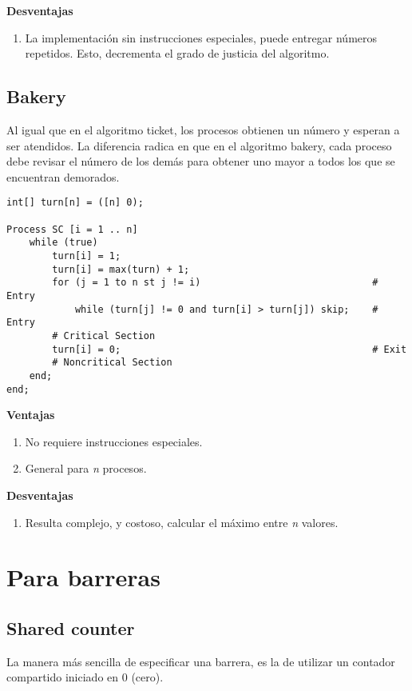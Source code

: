 \documentclass[a4paper, 10pt]{report}
\begin{document}
\textbf{Desventajas}
\begin{enumerate}
    \item La implementación sin instrucciones especiales, puede entregar números repetidos. Esto, decrementa el grado de justicia del algoritmo.
\end{enumerate}


\subsection{Bakery}

Al igual que en el algoritmo ticket, los procesos obtienen un número y esperan a ser atendidos. La diferencia radica en que en el algoritmo bakery, cada proceso debe revisar el número de los demás para obtener uno mayor a todos los que se encuentran demorados.

\begin{lstlisting}
int[] turn[n] = ([n] 0);

Process SC [i = 1 .. n]
    while (true)
        turn[i] = 1; 
        turn[i] = max(turn) + 1;
        for (j = 1 to n st j != i)                              # Entry
            while (turn[j] != 0 and turn[i] > turn[j]) skip;    # Entry
        # Critical Section
        turn[i] = 0;                                            # Exit
        # Noncritical Section
    end;
end;
\end{lstlisting}

\textbf{Ventajas}
\begin{enumerate}
    \item No requiere instrucciones especiales.
    \item General para \emph{n} procesos.
\end{enumerate}

\textbf{Desventajas}
\begin{enumerate}
    \item Resulta complejo, y costoso, calcular el máximo entre \emph{n} valores.
\end{enumerate}


\section{Para barreras}

\subsection{Shared counter}

La manera más sencilla de especificar una barrera, es la de utilizar un contador compartido iniciado en 0 (cero). 
\end{document}

